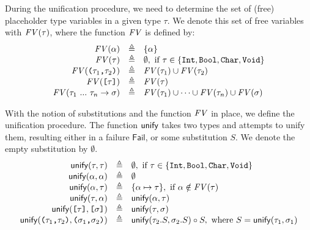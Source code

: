 During the unification procedure, we need to determine the set of (free)
placeholder type variables in a given type $\tau$.
We denote this set of free variables with $\mathit{FV}(\tau)$, where the function
$\mathit{FV}$ is defined by:
%
\[
\begin{array}{rcl}
  \mathit{FV}(\alpha) & \triangleq & \{ \alpha \} \\
  \mathit{FV}(\tau) & \triangleq & \emptyset, \text{ if } \tau \in \{\texttt{Int},\texttt{Bool},\texttt{Char},\texttt{Void}\} \\
  \mathit{FV}( \texttt{(}\tau_1\texttt{,}\tau_2\texttt{)} ) & \triangleq & \mathit{FV}(\tau_1) \cup \mathit{FV}(\tau_2) \\
  \mathit{FV}( \texttt{[}\tau\texttt{]} ) & \triangleq & \mathit{FV}(\tau) \\
  \mathit{FV}( \tau_1\ ...\ \tau_n \to \sigma ) & \triangleq &
    \mathit{FV}(\tau_1) \cup \dots \cup \mathit{FV}(\tau_n) \cup \mathit{FV}(\sigma)
\end{array}
\]

With the notion of substitutions and the function $\mathit{FV}$ in place, we define
the unification procedure. The function $\mathsf{unify}$ takes two types and attempts to
unify them, resulting either in a failure $\textsf{Fail}$, or some substitution
$S$. We denote the empty substitution by $\emptyset$.
%
\[
\begin{array}{rcl}
  \mathsf{unify}(\tau,\tau) & \triangleq & \emptyset, \text{ if } \tau \in \{\texttt{Int},\texttt{Bool},\texttt{Char},\texttt{Void}\} \\
  \mathsf{unify}(\alpha,\alpha) & \triangleq & \emptyset \\
  \mathsf{unify}(\alpha,\tau) & \triangleq &
    \{ \alpha \mapsto \tau \},\ \text{if}\ \alpha \notin \mathit{FV}(\tau) \\
  \mathsf{unify}(\tau,\alpha) & \triangleq & \mathsf{unify}(\alpha,\tau) \\
  \mathsf{unify}(\texttt{[}\tau\texttt{]},\texttt{[}\sigma\texttt{]}) & \triangleq & \mathsf{unify}(\tau,\sigma) \\
  \mathsf{unify}(\texttt{(}\tau_1\texttt{,}\tau_2\texttt{)}, \texttt{(}\sigma_1\texttt{,}\sigma_2\texttt{)}) & \triangleq &
    \mathsf{unify}( \tau_2.S, \sigma_2.S ) \circ S,
    \text{ where } S = \mathsf{unify}(\tau_1,\sigma_1)
\end{array}
\]

